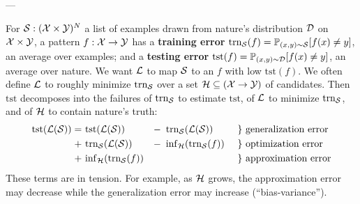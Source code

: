 \documentclass[11pt, justified]{tufte-book}
\newcommand{\samsubsubsection}[1]{
   \vspace{0.1cm}
   \par\noindent{\hspace{-2cm}\normalsize \sc \gre #1} ---
}
\newcommand{\Ein}  {\text{trn}_{\sS}}
\newcommand{\Eout} {\text{tst}}
\newcommand{\Pp}{\mathbb{P}}\newcommand{\pP}{\mathcal{P}}
\theoremstyle{definition}
\begin{document}
    \samsubsubsection{learning error}
      For $\mathcal{S} : (\mathcal{X}\times \mathcal{Y})^N$ a
      list of examples drawn from nature's distribution $\mathcal{D}$ on $\mathcal{X}\times
      \mathcal{Y}$, 
      a pattern $f:\mathcal{X}\to \mathcal{Y}$
      has a \textbf{training error}
      $
         \Ein(f) = \Pp_{(x,y)\sim \sS}[f(x)\neq y] 
      $,
      an average over examples;
      and a \textbf{testing error}
      $
         \Eout(f) = \Pp_{(x,y)\sim \dD}[f(x)\neq y] 
      $,
      an average over nature.
      We want $\mathcal{L}$ to map $\mathcal{S}$ to an $f$ with low $\Eout(f)$.\marginnote{%
      }
      We often define $\mathcal{L}$ to roughly minimize $\Ein$ over a
      set $\mathcal{H} \subseteq (\mathcal{X}\to \mathcal{Y})$ of candidates.  Then $\Eout$
      decomposes into the failures
      of $\Ein$ to estimate $\Eout$, %
      of $\mathcal{L}$ to minimize $\Ein$, and %
      of $\mathcal{H}$ to contain nature's truth: %
      \newcommand{\minf}[1]{{\inf}_{\hH}}
      \begin{align*}
          \Eout(\lL(\sS)) 
          =~&\Eout(\lL(\sS))      &-\,\,\,&      \Ein(\lL(\sS)) &~\}~& \text{generalization error} \\
          +~&\Ein(\lL(\sS))       &-\,\,\,& \minf{\hH}(\Ein(f)) &~\}~& \text{optimization error} \\
          +~&\minf{\hH}(\Ein(f))  &       &                     &~\}~& \text{approximation error}  
      \end{align*}
      These terms are in tension.  For example, as $\mathcal{H}$ grows, the
      approximation error may decrease while the generalization error may
      increase (``bias-variance'').
\end{document}

